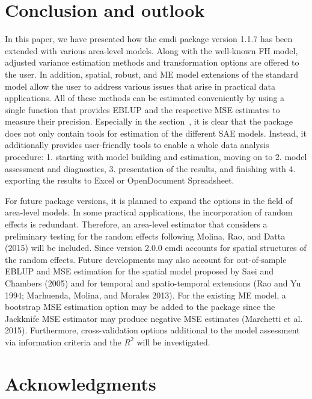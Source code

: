 \hypertarget{sec:concl}{%
\section{Conclusion and outlook}\label{sec:concl}}

In this paper, we have presented how the emdi package version 1.1.7 has
been extended with various area-level models. Along with the well-known
FH model, adjusted variance estimation methods and transformation
options are offered to the user. In addition, spatial, robust, and ME
model extensions of the standard model allow the user to address various
issues that arise in practical data applications. All of these methods
can be estimated conveniently by using a single function that provides
EBLUP and the respective MSE estimates to measure their precision.
Especially in the section~, it is clear that the package does not only
contain tools for estimation of the different SAE models. Instead, it
additionally provides user-friendly tools to enable a whole data
analysis procedure: 1. starting with model building and estimation,
moving on to 2. model assessment and diagnostics, 3. presentation of the
results, and finishing with 4. exporting the results to Excel or
OpenDocument Spreadsheet.

For future package versions, it is planned to expand the options in the
field of area-level models. In some practical applications, the
incorporation of random effects is redundant. Therefore, an area-level
estimator that considers a preliminary testing for the random effects
following Molina, Rao, and Datta (2015) will be included. Since version 2.0.0 emdi
accounts for spatial structures of the random effects. Future
developments may also account for out-of-sample EBLUP and MSE estimation
for the spatial model proposed by Saei and Chambers (2005) and for temporal and
spatio-temporal extensions (Rao and Yu 1994; Marhuenda, Molina, and Morales 2013). For the existing
ME model, a bootstrap MSE estimation option may be added to the package
since the Jackknife MSE estimator may produce negative MSE estimates
(Marchetti et al. 2015). Furthermore, cross-validation options additional to
the model assessment via information criteria and the \(R^2\) will be
investigated.

\hypertarget{sec:Acknowledgments}{%
\section{Acknowledgments}\label{sec:Acknowledgments}}

